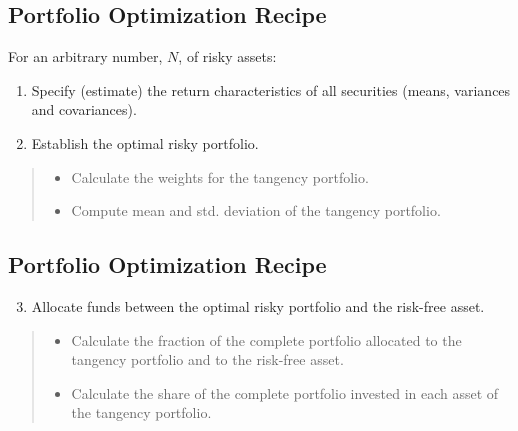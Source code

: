 \documentclass[letterpaper,10pt,english]{sphinxmanual}
\begin{document}
\subsection{Portfolio Optimization Recipe}
\label{multiAssetOpt:portfolio-optimization-recipe}
For an arbitrary number, $N$, of risky assets:
\begin{enumerate}
\item {} 
Specify (estimate) the return characteristics of all securities
(means, variances and covariances).

\end{enumerate}
\begin{enumerate}
\setcounter{enumi}{1}
\item {} 
Establish the optimal risky portfolio.

\end{enumerate}
\begin{quote}
\begin{itemize}
\item {} 
Calculate the weights for the tangency portfolio.

\end{itemize}
\begin{itemize}
\item {} 
Compute mean and std. deviation of the tangency portfolio.

\end{itemize}
\end{quote}


\subsection{Portfolio Optimization Recipe}
\label{multiAssetOpt:id7}\begin{enumerate}
\setcounter{enumi}{2}
\item {} 
Allocate funds between the optimal risky portfolio and the
risk-free asset.

\end{enumerate}
\begin{quote}
\begin{itemize}
\item {} 
Calculate the fraction of the complete portfolio allocated to the
tangency portfolio and to the risk-free asset.

\end{itemize}
\begin{itemize}
\item {} 
Calculate the share of the complete portfolio invested in each
asset of the tangency portfolio.

\end{itemize}
\end{quote}
\end{document}
